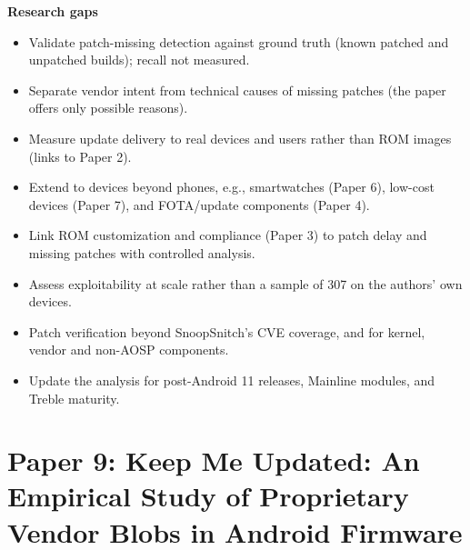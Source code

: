 \documentclass[11pt,a4paper]{article}
\begin{document}
\begin{enumerate}
    \vspace{4pt}
    \textbf{Research gaps}
    \begin{itemize}[leftmargin=*,itemsep=1pt,topsep=2pt]
        \item Validate patch-missing detection against ground truth (known patched and unpatched builds); recall not measured.
        \item Separate vendor intent from technical causes of missing patches (the paper offers only possible reasons).
        \item Measure update delivery to real devices and users rather than ROM images (links to Paper 2).
        \item Extend to devices beyond phones, e.g., smartwatches (Paper 6), low-cost devices (Paper 7), and FOTA/update components (Paper 4).
        \item Link ROM customization and compliance (Paper 3) to patch delay and missing patches with controlled analysis.
        \item Assess exploitability at scale rather than a sample of 307 on the authors' own devices.
        \item Patch verification beyond SnoopSnitch's CVE coverage, and for kernel, vendor and non-AOSP components.
        \item Update the analysis for post-Android 11 releases, Mainline modules, and Treble maturity.
    \end{itemize}

\end{enumerate}

\newpage

\section{Paper 9: Keep Me Updated: An Empirical Study of Proprietary Vendor Blobs in Android Firmware}
\end{document}
